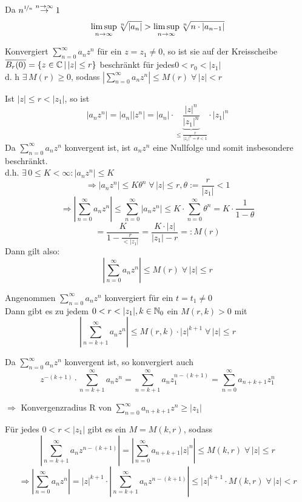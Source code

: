 \documentclass[../ana1u.tex]{subfiles}
\begin{document}
\begin{bew}
	Da \(n^{\nicefrac{1}{n}} \overset{n \rightarrow \infty}{\rightarrow} 1 \)
	\[\limsup\limits_{n\rightarrow\infty}\sqrt[n]{|a_n|} > \limsup\limits_{n\rightarrow\infty}\sqrt[n]{n \cdot |a_{n-1}|} \]
\end{bew}
\begin{kor}
	Konvergiert \(\sum_{n=0}^{\infty} a_n z^n \) für ein \(z = z_1 \neq 0 \), so ist sie auf der Kreisscheibe \(\overline{B_r(0)} = \{z \in \mathbb{C} \, | \, |z| \leq r\} \) beschränkt für jedes\(0 < r_0 < |z_1| \)\\
	d. h \(\exists \, M(r) \geq 0 \), sodass \(|\sum_{n=0}^{\infty} a_n z^n| \leq M(r) \; \forall \, |z| < r \)
\end{kor}
\begin{bew}
	Ist \(|z| \leq r < |z_1| \), so ist
	\[|a_n z^n| = |a_n||z^n| = |a_n| \cdot \underbrace{\frac{|z|^n}{|z_1|^n}}_{\leq \frac{r}{|z_1|^n = \theta < 1}} \cdot |z_1|^n \]
	Da \(\sum_{n=0}^{\infty} a_n z^n \) konvergent ist, ist \(a_n z^n\) eine Nullfolge und somit insbesondere beschränkt.\\
	d.h. \(\exists \, 0 \leq K < \infty: |a_n z^n| \leq K \)
	\[\Rightarrow |a_n z^n| \leq K\theta^n \; \forall \, |z| \leq r, \theta := \frac{r}{|z_1|} < 1 \]
	\[\Rightarrow \left|\sum_{n=0}^{\infty} a_n z^n\right| \leq \sum_{n=0}^{\infty} |a_n z^n| \leq K \cdot \sum_{n=0}^{\infty} \theta^n = K \cdot \frac{1}{1 - \theta} \]
	\[= \frac{K}{1 - \frac{r}{<|z_1|}} = \frac{K \cdot |z|}{|z_1| - r} =: M(r) \]
	Dann gilt also:
	\[|\sum_{n=0}^{\infty} a_n z^n| \leq M(r) \; \forall \, |z| \leq r \]
\end{bew}
\begin{kor}
	Angenommen \(\sum_{n=0}^{\infty} a_n z^n \) konvergiert für ein \(t = t_1 \neq 0\)\\
	Dann gibt es zu jedem \(0 < r < |z_1|, k \in \mathbb{N}_0 \) ein \(M(r, k) > 0 \) mit
	\[\left|\sum_{n=k+1}^{\infty} a_n z^n\right| \leq M(r, k) \cdot |z|^{k+1} \; \forall \, |z| \leq r \]
\end{kor}
\begin{bew}
	Da \(\sum_{n=0}^{\infty} a_n z^n \) konvergent ist, so konvergiert auch\\
	\[z^{-(k+1)} \cdot \sum_{n=k+1}^{\infty} a_n z^n = \sum_{n=k+1}^{\infty} a_n z_1^{n-(k+1)} = \sum_{n=0}^{\infty} a_{n+k+1} z_1^n \]
\end{bew}
\begin{lem}
	\(\Rightarrow\) Konvergenzradius R von \(\sum_{n=0}^{\infty} a_{n+k+1} z^n \geq |z_1| \)
\end{lem}
\begin{lem}
	Für jedes \(0 < r < |z_1| \) gibt es ein \(M = M(k,r) \), sodass
	\[\left|\sum_{n=k+1}^{\infty} a_{n} z^{n-(k+1)}\right| = \left|\sum_{n=0}^{\infty} a_{n+k+1} |z|^n\right| \leq M(k,r) \; \forall \, |z| \leq r \]
	\[\Rightarrow \left|\sum_{n=0}^{\infty} a_n z^n \right| = |z|^{k+1} \cdot \left|\sum_{n=k+1}^{\infty} a_{n} z^{n-(k+1)}\right| \leq |z|^{k+1} \cdot M(k,r) \; \forall \, |z| < r \]
\end{lem}
\end{document}
